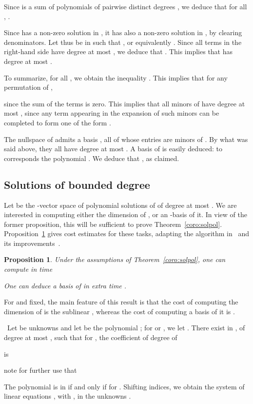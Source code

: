 \documentclass{sig-alternate}
\def\myproof{\noindent{\sc Proof.}~}
\def\foorp{\hfill}
\newtheorem{Prop}{Proposition}
\begin{document}
Since  is a sum of 
polynomials of pairwise distinct degrees , we deduce
that for all , .

Since  has a non-zero solution in , it has also a
non-zero solution in , by clearing denominators. Let thus 
be in  such that , or equivalently . Since all terms in the
right-hand side have degree at most , we deduce that
. This implies that  has degree
at most .

To summarize, for all , we obtain the inequality
. This implies that for 
any permutation  of , 

since the sum of the terms  is zero. This implies
that all minors of  have degree at most , since
any term appearing in the expansion of such minors can be completed
to form one of the form .

The nullspace of  admits a basis , all of whose 
entries are minors of . By what was said above, they all have
degree at most . A basis of  is easily deduced:
to  corresponds the polynomial
. We deduce that
, as claimed. \foorp



\subsection{Solutions of bounded degree}
 
\noindent Let  be the -vector space
of polynomial solutions of  of degree at most . We are
interested in computing either the dimension of , or an
-basis of it. In view of the former proposition, this will be
sufficient to prove
Theorem~\ref{coro:solpol}. Proposition~\ref{theo:solpol} gives cost
estimates for these tasks, adapting the algorithm in~\cite{AbBrPe95}
and its improvements~\cite{BoClSa05}.
\begin{Prop}\label{theo:solpol}
  Under the assumptions of Theorem~\ref{coro:solpol}, one can compute
   in time
  
One can deduce a basis of  in extra time
.
\end{Prop}
For  and  fixed, the main feature of this result is that the
cost of computing the dimension of  is the sublinear
, whereas the cost of computing a basis of it is
.

\smallskip \myproof Let  be unknowns and let
 be the polynomial
; for  or , we let
. There exist  in , of degree at
most , such that for , the coefficient of degree  of

is 

note for further use that

The polynomial  is in  if and only if  for . Shifting indices, we obtain the system of linear
equations , with , in the unknowns
.
\end{document}
